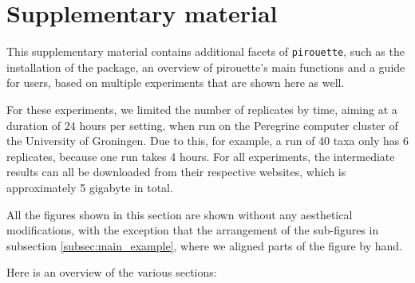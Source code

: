 \section{Supplementary material}

This supplementary material contains additional facets of \verb;pirouette;, such as the installation of the package, an overview of
pirouette's main functions and a guide for users, based on multiple experiments
that are shown here as well.

For these experiments, we limited the number of replicates by time, 
aiming at a duration of
24 hours per setting, when run on the Peregrine computer cluster of the
University of Groningen. Due to this, for example, a run of 40 taxa only
has 6 replicates, because one run takes 4 hours. For all experiments, the intermediate results can all be downloaded 
from their respective websites, which is approximately 5 gigabyte in total.

All the figures shown in this section are shown without any aesthetical modifications, with the exception that the arrangement
of the sub-figures in subsection \ref{subsec:main_example},
where we aligned parts of the figure by hand.

Here is an overview of the various sections:

